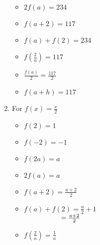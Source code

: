 \documentclass{ximera}
\begin{document}
\begin{enumerate}
\begin{itemize}
\end{itemize}


\begin{itemize}

\item  $2 f(a) = 234$
\item $f(a+2) = 117$
\item $f(a) + f(2) = 234$

\end{itemize}


\begin{itemize}

\item  $f \left( \frac{2}{a} \right) = 117$ 

 

 

\item $\frac{f(a)}{2} = \frac{117}{2}$

 

 


\item  $f(a + h) = 117$

\end{itemize}




\item For $f(x) = \frac{x}{2}$


\begin{itemize}

\item  $f(2) = 1$
\item  $f(-2) = -1$
\item  $f(2a) = a$

\end{itemize}


\begin{itemize}

\item  $2 f(a) = a$

\item $f(a+2) = \frac{a+2}{2}$

 

 

\item $f(a) + f(2) = \frac{a}{2}+ 1$ \\
      $\hphantom{f(a) + f(2)} = \frac{a+2}{2}$

\end{itemize}


\begin{itemize}

\item  $f \left( \frac{2}{a} \right) = \frac{1}{a}$


\end{itemize}
\end{enumerate}
\end{document}
